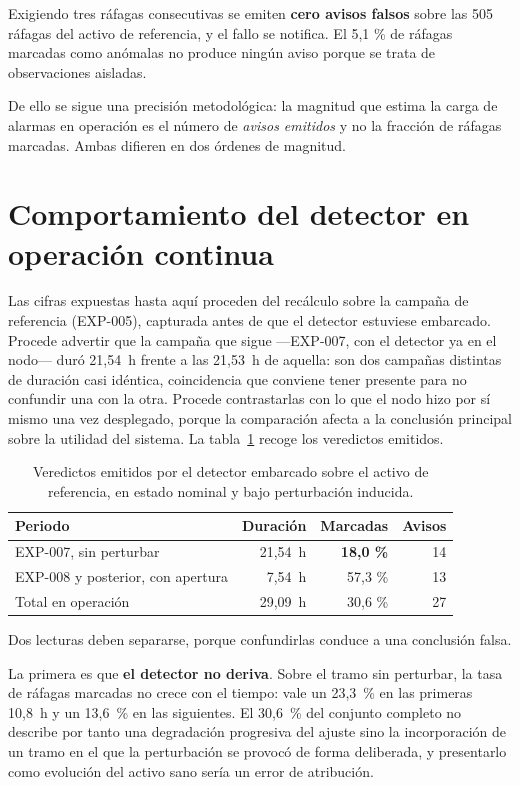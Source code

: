 Exigiendo tres ráfagas consecutivas se emiten \textbf{cero avisos falsos} sobre las 505 ráfagas
del activo de referencia, y el fallo se notifica. El 5,1 \% de ráfagas marcadas como anómalas no
produce ningún aviso porque se trata de observaciones aisladas.

De ello se sigue una precisión metodológica: la magnitud que estima la carga de alarmas en
operación es el número de \textit{avisos emitidos} y no la fracción de ráfagas marcadas. Ambas
difieren en dos órdenes de magnitud.

\section{Comportamiento del detector en operación continua}

Las cifras expuestas hasta aquí proceden del recálculo sobre la campaña de referencia (EXP-005),
capturada antes de que el detector estuviese embarcado. Procede advertir que la campaña que sigue
—EXP-007, con el detector ya en el nodo— duró \mbox{21,54 h} frente a las \mbox{21,53 h} de
aquella: son dos campañas distintas de duración casi idéntica, coincidencia que conviene tener
presente para no confundir una con la otra. Procede contrastarlas con lo que el nodo hizo por
sí mismo una vez desplegado, porque la comparación afecta a la conclusión principal sobre la
utilidad del sistema. La tabla~\ref{table:evolucion} recoge los veredictos emitidos.

\begin{table}[ht!]
\caption{Veredictos emitidos por el detector embarcado sobre el activo de referencia, en estado nominal y bajo perturbación inducida.}
\label{table:evolucion}
\centering
\begin{tabular}{|p{5.0cm}|r|r|r|}
\hline
\textbf{Periodo} & \textbf{Duración} & \textbf{Marcadas} & \textbf{Avisos} \\
\hline
EXP-007, sin perturbar & \mbox{21,54 h} & \textbf{18,0 \%} & 14 \\
\hline
EXP-008 y posterior, con apertura & \mbox{7,54 h} & 57,3 \% & 13 \\
\hline
Total en operación & \mbox{29,09 h} & 30,6 \% & 27 \\
\hline
\end{tabular}
\end{table}

Dos lecturas deben separarse, porque confundirlas conduce a una conclusión falsa.

La primera es que \textbf{el detector no deriva}. Sobre el tramo sin perturbar, la tasa de
ráfagas marcadas no crece con el tiempo: vale un \mbox{23,3 \%} en las primeras \mbox{10,8 h} y
un \mbox{13,6 \%} en las siguientes. El \mbox{30,6 \%} del conjunto completo no describe por
tanto una degradación progresiva del ajuste sino la incorporación de un tramo en el que la
perturbación se provocó de forma deliberada, y presentarlo como evolución del activo sano sería
un error de atribución.


